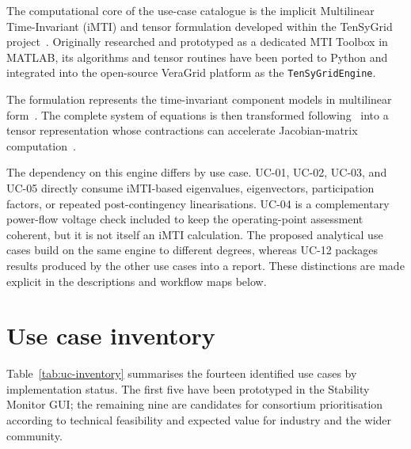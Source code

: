 The computational core of the use-case catalogue is the implicit Multilinear Time-Invariant (iMTI) and tensor formulation developed within the TenSyGrid project~\cite{Kaufmann2025TenSyGridD11,Wong2025TenSyGridD21}. Originally researched and prototyped as a dedicated MTI Toolbox in MATLAB, its algorithms and tensor routines have been ported to Python and integrated into the open-source VeraGrid platform as the \texttt{TenSyGridEngine}.

The formulation represents the time-invariant component models in multilinear form~\cite{deJuanVela2026TenSyGridD33}. The complete system of equations is then transformed following~\cite{Kaufmann2025TenSyGridD11,Wong2025TenSyGridD21} into a tensor representation whose contractions can accelerate Jacobian-matrix computation~\cite{kaufmann2026small}.

The dependency on this engine differs by use case. UC-01, UC-02, UC-03, and UC-05 directly consume iMTI-based eigenvalues, eigenvectors, participation factors, or repeated post-contingency linearisations. UC-04 is a complementary power-flow voltage check included to keep the operating-point assessment coherent, but it is not itself an iMTI calculation. The proposed analytical use cases build on the same engine to different degrees, whereas UC-12 packages results produced by the other use cases into a report. These distinctions are made explicit in the descriptions and workflow maps below.

\section{Use case inventory}

Table~\ref{tab:uc-inventory} summarises the fourteen identified use cases by implementation status. The first five have been prototyped in the Stability Monitor GUI; the remaining nine are candidates for consortium prioritisation according to technical feasibility and expected value for industry and the wider community.

